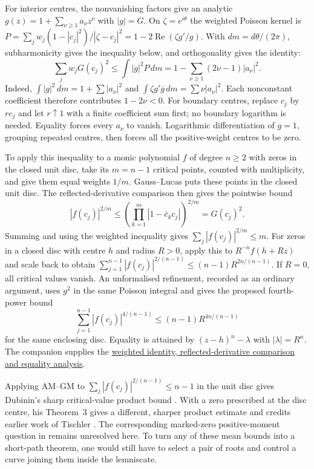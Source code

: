 \documentclass[11pt]{article}
\newcommand{\recordlink}[3]{\href{#1\##2}{#3}}
\begin{document}
For interior centres, the nonvanishing factors give an analytic
$g(z)=1+\sum_{\nu\ge1}a_\nu z^\nu$ with $|g|=G$. On
$\zeta=e^{i\theta}$ the weighted Poisson kernel is
$P=\sum_jw_j(1-|c_j|^2)/|\zeta-c_j|^2
=1-2\operatorname{Re}(\zeta g'/g)$.
With $dm=d\theta/(2\pi)$, subharmonicity gives the inequality below,
and orthogonality gives the identity:
\[
 \sum_jw_jG(c_j)^2\le\int |g|^2P\,dm
          =1-\sum_{\nu\ge1}(2\nu-1)|a_\nu|^2.
\]
Indeed, $\int|g|^2\,dm=1+\sum|a_\nu|^2$ and
$\int\zeta g'\overline g\,dm=\sum\nu|a_\nu|^2$.
Each nonconstant coefficient therefore contributes $1-2\nu<0$. For boundary centres, replace
$c_j$ by $rc_j$ and let $r\uparrow1$ with a finite coefficient sum
first; no boundary logarithm is needed. Equality forces every $a_\nu$
to vanish. Logarithmic differentiation of $g=1$, grouping repeated
centres, then forces all the positive-weight centres to be zero.

\noindent{}\label{res:fp-to-s}
To apply this inequality to a monic polynomial $f$ of degree $n\ge2$
with zeros in the closed unit disc, take its $m=n-1$ critical points,
counted with multiplicity, and give them equal weights $1/m$.
Gauss--Lucas puts these points in the closed unit disc. The
reflected-derivative comparison then gives the pointwise bound
\[
 |f(c_j)|^{2/m}\le
 \left(\prod_{k=1}^m|1-\bar c_kc_j|\right)^{2/m}=G(c_j)^2.
\]
Summing and using the weighted inequality gives
$\sum_j|f(c_j)|^{2/m}\le m$. For zeros in a closed disc with centre $h$
and radius $R>0$, apply this to $R^{-n}f(h+Rz)$ and scale back to obtain
$\sum_{j=1}^{n-1}|f(c_j)|^{2/(n-1)}\le(n-1)R^{2n/(n-1)}$.
If $R=0$, all critical values vanish. An unformalised refinement, recorded as an ordinary argument, uses
$g^2$ in the same Poisson integral and gives the proposed fourth-power bound
\[
 \sum_{j=1}^{n-1}|f(c_j)|^{4/(n-1)}
       \le(n-1)R^{4n/(n-1)}
\]
for the same enclosing disc. Equality is attained
by $(z-h)^n-\lambda$ with $|\lambda|=R^n$.
The companion supplies the
\recordlink{erdos1041-lemniscate-reasoning-surface.pdf}{weighted-poisson-proof}
{weighted identity, reflected-derivative comparison and equality analysis}.

Applying AM--GM to
$\sum_j|f(c_j)|^{2/(n-1)}\le n-1$ in the unit disc gives
Dubinin's sharp critical-value product bound \cite[Theorem~2]{dubinin2006critical}. With a
zero prescribed at the disc centre, his Theorem~3 gives a different,
sharper product estimate and credits earlier work of Tischler
\cite[p.~444, as discussed by Dubinin]{tischler1989}. The corresponding marked-zero positive-moment question in
\cite{revision2026} remains unresolved here. To turn any of these mean
bounds into a short-path theorem, one would still have to select a pair
of roots and control a curve joining them inside the lemniscate.
\end{document}
